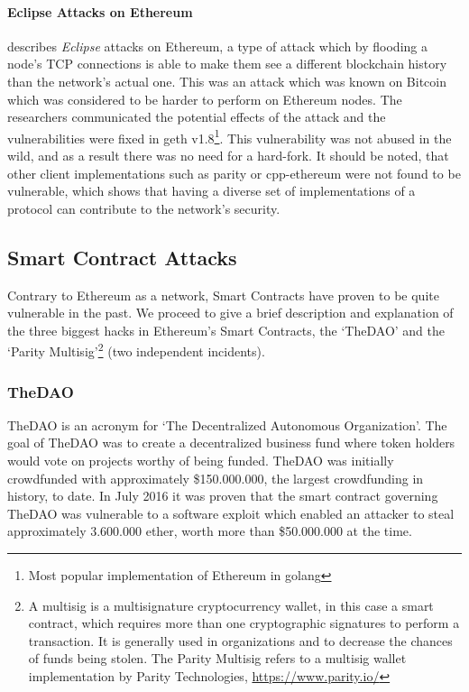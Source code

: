\paragraph{Eclipse Attacks on Ethereum}
\cite{cryptoeprint:2018:236} describes \textit{Eclipse} attacks on Ethereum, a type of attack which by flooding a node's TCP connections is able to make them see a different blockchain history than the network's actual one. This was an attack which was known on Bitcoin which was considered to be harder to perform on Ethereum nodes. The researchers communicated the potential effects of the attack and the vulnerabilities were fixed in geth v1.8\footnote{Most popular implementation of Ethereum in golang}. This vulnerability was not abused in the wild, and as a result there was no need for a hard-fork. It should be noted, that other client implementations such as parity or cpp-ethereum were not found to be vulnerable, which shows that having a diverse set of implementations of a protocol can contribute to the network's security.

\subsection{Smart Contract Attacks}
Contrary to Ethereum as a network, Smart Contracts have proven to be quite vulnerable in the past. We proceed to give a brief description and explanation of the three biggest hacks in Ethereum's Smart Contracts, the `TheDAO' and the `Parity Multisig'\footnote{A multisig is a multisignature cryptocurrency wallet, in this case a smart contract, which requires more than one cryptographic signatures to perform a transaction. It is generally used in organizations and to decrease the chances of funds being stolen. The Parity Multisig refers to a multisig wallet implementation by Parity Technologies, \url{https://www.parity.io/}} (two independent incidents).

\subsubsection{TheDAO} \label{thedao}
TheDAO is an acronym for `The Decentralized Autonomous Organization'. The goal of TheDAO was to create a decentralized business fund where token holders would vote on projects worthy of being funded. TheDAO was initially crowdfunded with approximately \$150.000.000, the largest crowdfunding in history, to date. In July 2016 it was proven that the smart contract governing TheDAO was vulnerable to a software exploit which enabled an attacker to steal approximately 3.600.000 ether, worth more than \$50.000.000 at the time.

